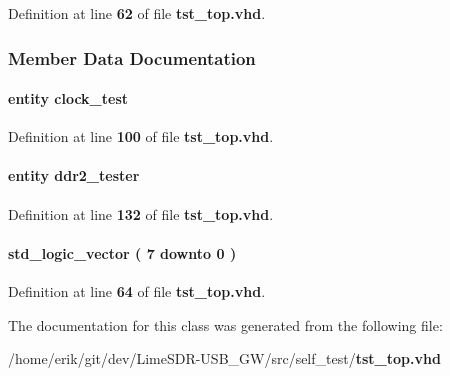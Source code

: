 Definition at line {\bf 62} of file {\bf tst\+\_\+top.\+vhd}.



\subsubsection{Member Data Documentation}
\paragraph[{clock\+\_\+test\+\_\+inst0}]{ {\bfseries \textcolor{keywordflow}{entity}\textcolor{vhdlchar}{ }\textcolor{vhdlchar}{clock\+\_\+test}\textcolor{vhdlchar}{ }} \hspace{0.3cm}{\ttfamily [Instantiation]}}\label{classtst__top_1_1arch_a6d57a6038ca9596a5dc06ce7ba532a3e}


Definition at line {\bf 100} of file {\bf tst\+\_\+top.\+vhd}.

\paragraph[{ddr2\+\_\+tester\+\_\+inst2}]{ {\bfseries \textcolor{keywordflow}{entity}\textcolor{vhdlchar}{ }\textcolor{vhdlchar}{ddr2\+\_\+tester}\textcolor{vhdlchar}{ }} \hspace{0.3cm}{\ttfamily [Instantiation]}}\label{classtst__top_1_1arch_a4de2544866df40f5702da2313d9393e0}


Definition at line {\bf 132} of file {\bf tst\+\_\+top.\+vhd}.

\paragraph[{my\+\_\+sig\+\_\+name}]{ {\bfseries \textcolor{comment}{std\+\_\+logic\+\_\+vector}\textcolor{vhdlchar}{ }\textcolor{vhdlchar}{(}\textcolor{vhdlchar}{ }\textcolor{vhdlchar}{ } \textcolor{vhdldigit}{7} \textcolor{vhdlchar}{ }\textcolor{keywordflow}{downto}\textcolor{vhdlchar}{ }\textcolor{vhdlchar}{ } \textcolor{vhdldigit}{0} \textcolor{vhdlchar}{ }\textcolor{vhdlchar}{)}\textcolor{vhdlchar}{ }} \hspace{0.3cm}{\ttfamily [Signal]}}\label{classtst__top_1_1arch_a492cbcfcb7826219bab98e0519497def}


Definition at line {\bf 64} of file {\bf tst\+\_\+top.\+vhd}.



The documentation for this class was generated from the following file\+:\begin{DoxyCompactItemize}
\item 
/home/erik/git/dev/\+Lime\+S\+D\+R-\/\+U\+S\+B\+\_\+\+G\+W/src/self\+\_\+test/{\bf tst\+\_\+top.\+vhd}\end{DoxyCompactItemize}
